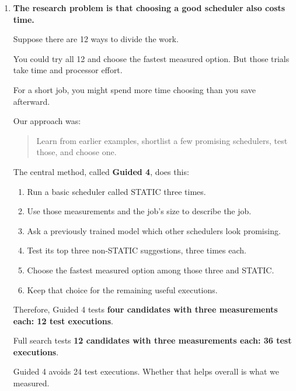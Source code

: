 \documentclass[11pt,a4paper]{article}
\providecommand{\tightlist}{\setlength{\itemsep}{0pt}\setlength{\parskip}{3pt}}
\begin{document}
\begin{enumerate}
  \textbf{OpenMP} is the software system that lets a C++ program divide loop iterations among threads.

  We used an existing library called \textbf{LB4OMP}, which provides 12 scheduling options. We did not invent those 12 options.

  A scheduler changes \textbf{who does which work and when}. The program should still produce the same answer.
\item
  \textbf{The research problem is that choosing a good scheduler also costs time.}

  Suppose there are 12 ways to divide the work.

  You could try all 12 and choose the fastest measured option. But those trials take time and processor effort.

  For a short job, you might spend more time choosing than you save afterward.

  Our approach was:

  \begin{quote}
  Learn from earlier examples, shortlist a few promising schedulers, test those, and choose one.
  \end{quote}

  The central method, called \textbf{Guided 4}, does this:

  \begin{enumerate}
  \def\labelenumii{\arabic{enumii}.}
  \tightlist
  \item
    Run a basic scheduler called STATIC three times.
  \item
    Use those measurements and the job's size to describe the job.
  \item
    Ask a previously trained model which other schedulers look promising.
  \item
    Test its top three non-STATIC suggestions, three times each.
  \item
    Choose the fastest measured option among those three and STATIC.
  \item
    Keep that choice for the remaining useful executions.
  \end{enumerate}

  Therefore, Guided 4 tests \textbf{four candidates with three measurements each: 12 test executions}.

  Full search tests \textbf{12 candidates with three measurements each: 36 test executions}.

  Guided 4 avoids 24 test executions. Whether that helps overall is what we measured.


\end{enumerate}
\end{document}
